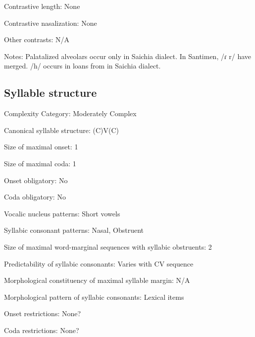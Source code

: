 {\begin{appendixdesc}
\item[Contrastive length:] None

\item[Contrastive nasalization:] None

\item[Other contrasts:] N/A

\item[Notes:] Palatalized alveolars occur only in Saichia dialect. In Santimen, /ɾ r/ have merged. /h/ occurs in loans from  in Saichia dialect.
\end{appendixdesc}
\subsection*{Syllable structure}
\begin{appendixdesc}

\item[Complexity Category:] Moderately Complex

\item[Canonical syllable structure:] (C)V(C) \citep[31--34]{Chang2006}

\item[Size of maximal onset:] 1

\item[Size of maximal coda:] 1

\item[Onset obligatory:] No

\item[Coda obligatory:] No

\item[Vocalic nucleus patterns:] Short vowels

\item[Syllabic consonant patterns:] Nasal, Obstruent

\item[Size of maximal word-marginal sequences with syllabic obstruents:] 2

\item[Predictability of syllabic consonants:] Varies with CV sequence

\item[Morphological constituency of maximal syllable margin:] N/A

\item[Morphological pattern of syllabic consonants:] Lexical items

\item[Onset restrictions:] None?

\item[Coda restrictions:] None?


\end{appendixdesc}}

